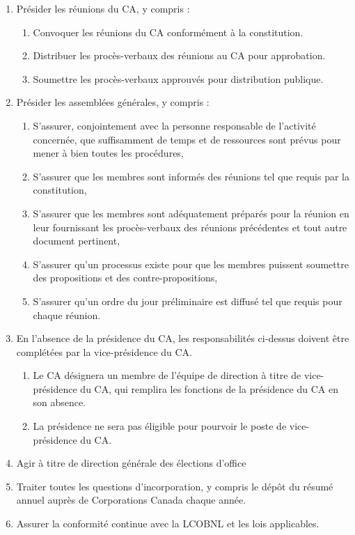\begin{enumerate}
 \item Présider les réunions du CA, y compris :
  \begin{enumerate}
   \item Convoquer les réunions du CA conformément à la constitution.
   \item Distribuer les procès-verbaux des réunions au CA pour approbation.
   \item Soumettre les procès-verbaux approuvés pour distribution publique.
  \end{enumerate}
 \item Présider les assemblées générales, y compris :
  \begin{enumerate}
   \item S'assurer, conjointement avec la personne responsable de l'activité concernée, que suffisamment de temps et de ressources sont prévus pour mener à bien toutes les procédures,
   \item S'assurer que les membres sont informés des réunions tel que requis par la constitution,
   \item S'assurer que les membres sont adéquatement préparés pour la réunion en leur fournissant les procès-verbaux des réunions précédentes et tout autre document pertinent,
   \item S'assurer qu'un processus existe pour que les membres puissent soumettre des propositions et des contre-propositions,
   \item S'assurer qu'un ordre du jour préliminaire est diffusé tel que requis pour chaque réunion.
  \end{enumerate}
 \item En l'absence de la présidence du CA, les responsabilités ci-dessus doivent être complétées par la vice-présidence du CA.
  \begin{enumerate}
   \item Le CA désignera un membre de l'équipe de direction à titre de vice-présidence du CA, qui remplira les fonctions de la présidence du CA en son absence.
   \item La présidence ne sera pas éligible pour pourvoir le poste de vice-présidence du CA.
  \end{enumerate}
 \item Agir à titre de direction générale des élections d'office
 \item Traiter toutes les questions d'incorporation, y compris le dépôt du résumé annuel auprès de Corporations Canada chaque année.
 \item Assurer la conformité continue avec la LCOBNL et les lois applicables.
\end{enumerate}
